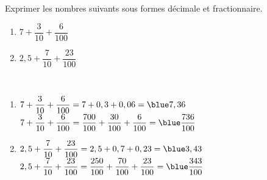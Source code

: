 \begin{exercice} %
   Exprimer les nombres suivants sous formes décimale et fractionnaire. \smallskip
   \begin{multicols}{2}
      \begin{enumerate}
         \item $7+\dfrac{3}{10}+\dfrac{6}{100}$
         \item $2,5+\dfrac{7}{10}+\dfrac{23}{100}$
      \end{enumerate}
   \end{multicols}
\end{exercice}

\begin{corrige}
   \ \\ [-5mm]
   \begin{enumerate}
      \item $7+\dfrac{3}{10}+\dfrac{6}{100} = 7+0,3+0,06 ={\blue 7,36}$ \\ [2mm]
         $7+\dfrac{3}{10}+\dfrac{6}{100} =\dfrac{700}{100}+\dfrac{30}{100}+\dfrac{6}{100} ={\blue \dfrac{736}{100}}$ \medskip
      \item $2,5+\dfrac{7}{10}+\dfrac{23}{100} = 2,5+0,7+0,23 ={\blue 3,43}$ \\ [2mm]
         $2,5+\dfrac{7}{10}+\dfrac{23}{100} =\dfrac{250}{100}+\dfrac{70}{100}+\dfrac{23}{100} ={\blue \dfrac{343}{100}}$
   \end{enumerate}
\end{corrige}